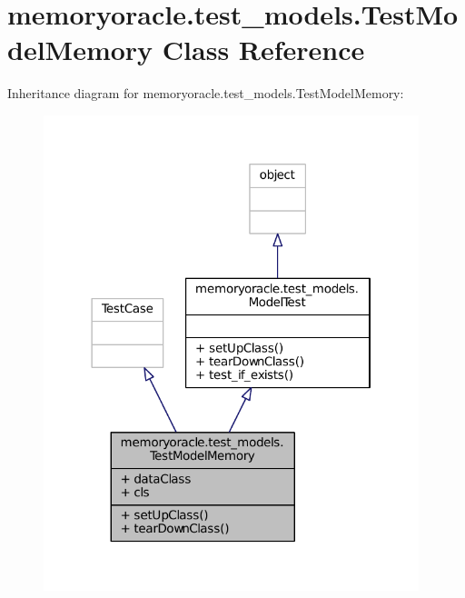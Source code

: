 \hypertarget{classmemoryoracle_1_1test__models_1_1TestModelMemory}{}\section{memoryoracle.\+test\+\_\+models.\+Test\+Model\+Memory Class Reference}
\label{classmemoryoracle_1_1test__models_1_1TestModelMemory}


Inheritance diagram for memoryoracle.\+test\+\_\+models.\+Test\+Model\+Memory\+:\nopagebreak
\begin{figure}[H]
\begin{center}
\leavevmode
\includegraphics[width=310pt]{classmemoryoracle_1_1test__models_1_1TestModelMemory__inherit__graph}
\end{center}
\end{figure}


